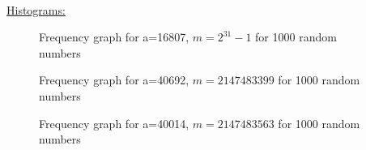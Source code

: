 \documentclass[11pt]{article}
\begin{document}
\newpage
\underline{\\Histograms:}
\begin{figure}[H]
	\centering
	\caption{Frequency graph for a=16807, $m=2^{31}-1$ for 1000 random numbers}
\end{figure}
\begin{figure}[H]
	\centering
	\caption{Frequency graph for a=40692, $m=2147483399$ for 1000 random numbers}
\end{figure}
\begin{figure}[H]
	\centering
	\caption{Frequency graph for a=40014, $m=2147483563$ for 1000 random numbers}
\end{figure}
\end{document}
